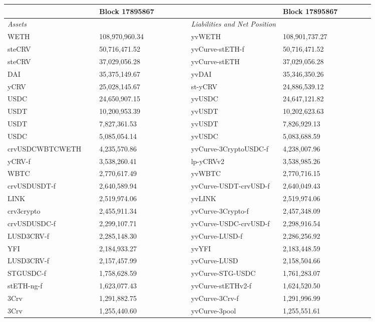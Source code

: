 
\begin{longtable}{@{}p{0.25\linewidth}p{0.25\linewidth}p{0.25\linewidth}p{0.25\linewidth}@{}}

\toprule


& Block 17895867 & & Block 17895867 \\

\midrule
\textit{Assets} & & \textit{Liabilities and Net Position} \\
WETH & 108,970,960.34 & yvWETH &108,901,737.27 \\
steCRV & 50,716,471.52 & yvCurve-stETH-f &50,716,471.52 \\
steCRV & 37,029,056.28 & yvCurve-stETH &37,029,056.28 \\
DAI & 35,375,149.67 & yvDAI &35,346,350.26 \\
yCRV & 25,028,145.67 & st-yCRV &24,886,539.12 \\
USDC & 24,650,907.15 & yvUSDC &24,647,121.82 \\
USDT & 10,200,953.39 & yvUSDT &10,202,623.63 \\
USDT & 7,827,361.53 & yvUSDT &7,826,929.13 \\
USDC & 5,085,054.14 & yvUSDC &5,083,688.59 \\
crvUSDCWBTCWETH & 4,235,570.86 & yvCurve-3CryptoUSDC-f &4,238,007.96 \\
yCRV-f & 3,538,260.41 & lp-yCRVv2 &3,538,985.26 \\
WBTC & 2,770,617.49 & yvWBTC &2,770,716.15 \\
crvUSDUSDT-f & 2,640,589.94 & yvCurve-USDT-crvUSD-f &2,640,049.43 \\
LINK & 2,519,974.06 & yvLINK &2,519,974.06 \\
crv3crypto & 2,455,911.34 & yvCurve-3Crypto-f &2,457,348.09 \\
crvUSDUSDC-f & 2,299,107.71 & yvCurve-USDC-crvUSD-f &2,298,916.54 \\
LUSD3CRV-f & 2,285,148.30 & yvCurve-LUSD-f &2,286,256.92 \\
YFI & 2,184,933.27 & yvYFI &2,183,448.59 \\
LUSD3CRV-f & 2,157,457.99 & yvCurve-LUSD &2,158,504.66 \\
STGUSDC-f & 1,758,628.59 & yvCurve-STG-USDC &1,761,283.07 \\
stETH-ng-f & 1,623,077.43 & yvCurve-stETHv2-f &1,624,520.50 \\
3Crv & 1,291,882.75 & yvCurve-3Crv-f &1,291,996.99 \\
3Crv & 1,255,440.60 & yvCurve-3pool &1,255,551.61 \\

\end{longtable}
